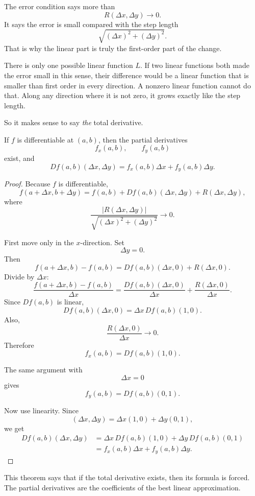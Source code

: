 The error condition says more than
\[
    R(\Delta x,\Delta y)\to0.
\]
It says the error is small compared with the step length
\[
    \sqrt{(\Delta x)^2+(\Delta y)^2}.
\]
That is why the linear part is truly the first-order part of the change.

There is only one possible linear function \(L\).  If two linear functions both made the
error small in this sense, their difference would be a linear function that is smaller than
first order in every direction.  A nonzero linear function cannot do that.  Along any
direction where it is not zero, it grows exactly like the step length.

So it makes sense to say \emph{the} total derivative.

\begin{theorem}
If \(f\) is differentiable at \((a,b)\), then the partial derivatives
\[
    f_x(a,b),\qquad f_y(a,b)
\]
exist, and
\[
\boxed{
    Df(a,b)(\Delta x,\Delta y)
    =
    f_x(a,b)\Delta x+f_y(a,b)\Delta y.
}
\]
\end{theorem}

\begin{proof}
Because \(f\) is differentiable,
\[
    f(a+\Delta x,b+\Delta y)
    =
    f(a,b)+Df(a,b)(\Delta x,\Delta y)+R(\Delta x,\Delta y),
\]
where
\[
    \frac{|R(\Delta x,\Delta y)|}{\sqrt{(\Delta x)^2+(\Delta y)^2}}\to0.
\]

First move only in the \(x\)-direction.  Set
\[
    \Delta y=0.
\]
Then
\[
    f(a+\Delta x,b)-f(a,b)
    =
    Df(a,b)(\Delta x,0)+R(\Delta x,0).
\]
Divide by \(\Delta x\):
\[
    \frac{f(a+\Delta x,b)-f(a,b)}{\Delta x}
    =
    \frac{Df(a,b)(\Delta x,0)}{\Delta x}
    +
    \frac{R(\Delta x,0)}{\Delta x}.
\]
Since \(Df(a,b)\) is linear,
\[
    Df(a,b)(\Delta x,0)=\Delta x\,Df(a,b)(1,0).
\]
Also,
\[
    \frac{R(\Delta x,0)}{\Delta x}\to0.
\]
Therefore
\[
    f_x(a,b)=Df(a,b)(1,0).
\]

The same argument with
\[
    \Delta x=0
\]
gives
\[
    f_y(a,b)=Df(a,b)(0,1).
\]

Now use linearity.  Since
\[
    (\Delta x,\Delta y)=\Delta x(1,0)+\Delta y(0,1),
\]
we get
\[
\begin{aligned}
Df(a,b)(\Delta x,\Delta y)
&=
\Delta x\,Df(a,b)(1,0)+\Delta y\,Df(a,b)(0,1)\\
&=
f_x(a,b)\Delta x+f_y(a,b)\Delta y.
\end{aligned}
\]
\end{proof}

This theorem says that if the total derivative exists, then its formula is forced.  The
partial derivatives are the coefficients of the best linear approximation.

